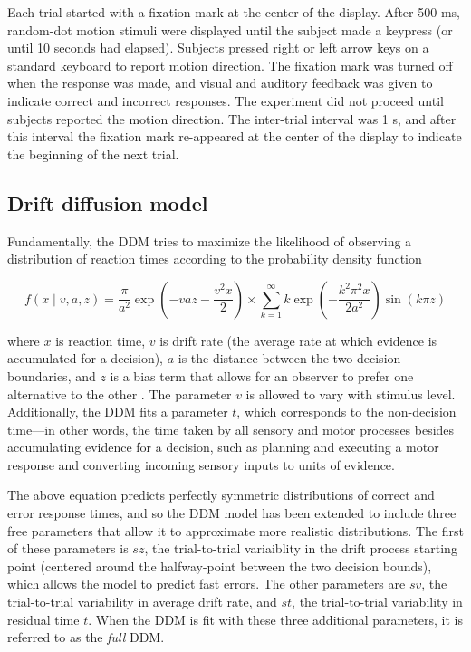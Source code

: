 \documentclass[../uwthesis.tex]{subfiles}
\begin{document}
Each trial started with a fixation mark at the center of the display. After 500 ms, random-dot motion stimuli were displayed until the subject made a keypress (or until 10 seconds had elapsed). Subjects pressed right or left arrow keys on a standard keyboard to report motion direction. The fixation mark was turned off when the response was made, and visual and auditory
feedback was given to indicate correct and incorrect responses. The experiment did not proceed until subjects reported the motion direction. The inter-trial interval was 1 s, and after this interval the fixation mark re-appeared at the center of the display to indicate the beginning of the next trial.

\subsection{Drift diffusion model}
Fundamentally, the DDM tries to maximize the likelihood of observing a distribution of reaction times according to the probability density function

\begin{equation}
f(x\mid v,a,z) = \frac{\pi}{a^2} \exp(-vaz-\frac{v^2x}{2}) \times
\sum_{k=1}^{\infty} k \exp(-\frac{k^2\pi^2x}{2a^2}) \sin(k\pi z)
\end{equation}

where $x$ is reaction time, $v$ is drift rate (the average rate at which evidence is accumulated for a decision), $a$ is the distance between the two decision boundaries, and $z$ is a bias term that allows for an observer to prefer one alternative to the other \citep{Wald1947SequentialAnalysis}. The parameter $v$ is allowed to vary with stimulus level. Additionally, the DDM fits a parameter $t$, which corresponds to the non-decision time---in other words, the time taken by all sensory and motor processes besides accumulating evidence for a decision, such as planning and executing a motor response and converting incoming sensory inputs to units of evidence.

The above equation predicts perfectly symmetric distributions of correct and error response times, and so the DDM model has been extended to include three free parameters that allow it to approximate more realistic distributions. The first of these parameters is $sz$, the trial-to-trial variaiblity in the drift process starting point (centered around the halfway-point between the two decision bounds), which allows the model to predict fast errors. The other parameters are $sv$, the trial-to-trial variability in average drift rate, and $st$, the trial-to-trial variability in residual time $t$. When the DDM is fit with these three additional parameters, it is referred to as the \textit{full} DDM.
\end{document}
